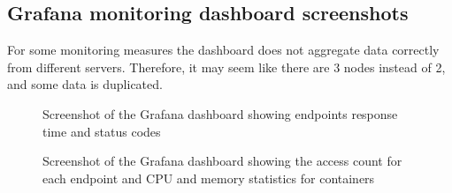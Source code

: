 \documentclass{article}
\begin{document}
\subsection{Grafana monitoring dashboard screenshots}
\label{monitoring_dashboard}
For some monitoring measures the dashboard does not aggregate data correctly from different servers. Therefore, it may seem like there are 3 nodes instead of 2, and some data is duplicated.

\begin{figure}[H]
   \centering
   \caption{Screenshot of the Grafana dashboard showing endpoints response time and status codes}
\end{figure}

\begin{figure}[H]
   \centering
   \caption{Screenshot of the Grafana dashboard showing the access count for each endpoint and CPU and memory statistics for containers}
\end{figure}
\end{document}

